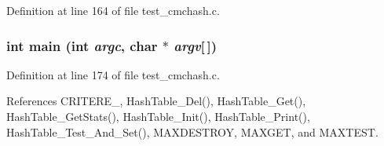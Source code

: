 Definition at line 164 of file test\_\-cmchash.c.
\subsubsection{\setlength{\rightskip}{0pt plus 5cm}int main (int {\em argc}, char $\ast$ {\em argv}[$\,$])}\label{test__cmchash_8c_a12}




Definition at line 174 of file test\_\-cmchash.c.

References CRITERE\_, Hash\-Table\_\-Del(), Hash\-Table\_\-Get(), Hash\-Table\_\-Get\-Stats(), Hash\-Table\_\-Init(), Hash\-Table\_\-Print(), Hash\-Table\_\-Test\_\-And\_\-Set(), MAXDESTROY, MAXGET, and MAXTEST.